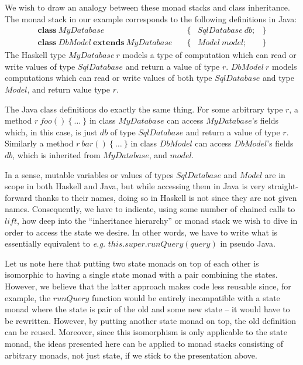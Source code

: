 We wish to draw an analogy between these monad stacks and class inheritance. The monad stack in our example corresponds to the following definitions in Java:
\begin{displaymath}
\begin{array}{lclc}
\mathbf{class}~\mathit{MyDatabase} & \quad \{ & \mathit{SqlDatabase}~\mathit{db}; & \} \\
\mathbf{class}~\mathit{DbModel}~\mathbf{extends}~\mathit{MyDatabase} & \quad \{ & \mathit{Model}~\mathit{model}; & \}
\end{array}
\end{displaymath}
The Haskell type $\mathit{MyDatabase}~r$ models a type of computation which can read or write values of type $\mathit{SqlDatabase}$ and return a value of type $r$. $\mathit{DbModel}~r$ models computations which can read or write values of both type $\mathit{SqlDatabase}$ and type $\mathit{Model}$, and return value type $r$.

The Java class definitions do exactly the same thing. For some arbitrary type $r$, a method $r~\mathit{foo}()~\{~\ldots~\}$ in class $\mathit{MyDatabase}$ can access $\mathit{MyDatabase}$'s fields which, in this case, is just $\mathit{db}$ of type $\mathit{SqlDatabase}$ and return a value of type $r$.  Similarly a method $r~\mathit{bar}()~\{~\ldots~\}$ in class $\mathit{DbModel}$ can access $\mathit{DbModel}$'s fields $\mathit{db}$, which is inherited from $\mathit{MyDatabase}$, and $\mathit{model}$. 

In a sense, mutable variables or values of types $\mathit{SqlDatabase}$ and $\mathit{Model}$ are in scope in both Haskell and Java, but while accessing them in Java is very straight-forward thanks to their names, doing so in Haskell is not since they are not given names. Consequently, we have to indicate, using some number of chained calls to $\mathit{lift}$, how deep into the ``inheritance hierarchy'' or monad stack we wish to dive in order to access the state we desire. In other words, we have to write what is essentially equivalent to \emph{e.g.} $\mathit{this}.\mathit{super}.\mathit{runQuery}(\mathit{query})$ in pseudo Java. 

Let us note here that putting two state monads on top of each other is isomorphic to having a single state monad with a pair combining the states. However, we believe that the latter approach makes code less reusable since, for example, the $\mathit{runQuery}$ function would be entirely incompatible with a state monad where the state is pair of the old and some new state -- it would have to be rewritten. However, by putting another state monad on top, the old definition can be reused. Moreover, since this isomorphism is only applicable to the state monad, the ideas presented here can be applied to monad stacks consisting of arbitrary monads, not just state, if we stick to the presentation above. 

